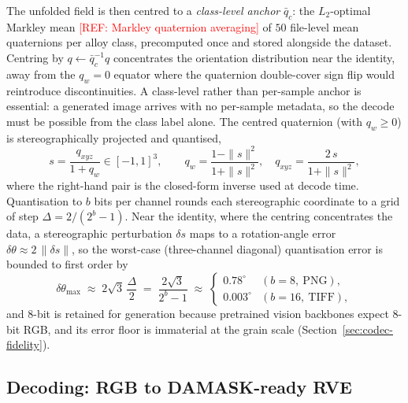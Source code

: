 \documentclass[preprint,12pt]{elsarticle}
\newcommand{\refneeded}[1]{\textcolor{red}{[REF: #1]}} %
\begin{document}
The unfolded field is then centred to a \emph{class-level anchor} $\bar{q}_c$: the $L_2$-optimal Markley mean \refneeded{Markley quaternion averaging} of $50$ file-level mean quaternions per alloy class, precomputed once and stored alongside the dataset. Centring by $q \leftarrow \bar{q}_c^{-1} q$ concentrates the orientation distribution near the identity, away from the $q_w = 0$ equator where the quaternion double-cover sign flip would reintroduce discontinuities. A class-level rather than per-sample anchor is essential: a generated image arrives with no per-sample metadata, so the decode must be possible from the class label alone. The centred quaternion (with $q_w \geq 0$) is stereographically projected and quantised,
\begin{equation}
s = \frac{q_{xyz}}{1 + q_w} \in [-1,1]^3 ,
\qquad
q_w = \frac{1 - \|s\|^2}{1 + \|s\|^2} , \quad
q_{xyz} = \frac{2\,s}{1 + \|s\|^2} ,
\label{eq:stereo}
\end{equation}
where the right-hand pair is the closed-form inverse used at decode time. Quantisation to $b$ bits per channel rounds each stereographic coordinate to a grid of step $\Delta = 2/(2^{b}-1)$. Near the identity, where the centring concentrates the data, a stereographic perturbation $\delta s$ maps to a rotation-angle error $\delta\theta \approx 2\,\|\delta s\|$, so the worst-case (three-channel diagonal) quantisation error is bounded to first order by
\begin{equation}
  \delta\theta_{\max} \;\approx\; 2\sqrt{3}\,\frac{\Delta}{2} \;=\; \frac{2\sqrt{3}}{2^{b}-1} \;\approx\;
  \begin{cases}
    0.78^{\circ} & (b = 8,\ \text{PNG}),\\
    0.003^{\circ} & (b = 16,\ \text{TIFF}),
  \end{cases}
  \label{eq:quant}
\end{equation}
and $8$-bit is retained for generation because pretrained vision backbones expect $8$-bit RGB, and its error floor is immaterial at the grain scale (Section~\ref{sec:codec-fidelity}).

\subsection{Decoding: RGB to DAMASK-ready RVE}
\label{sec:codec-decode}
\end{document}
